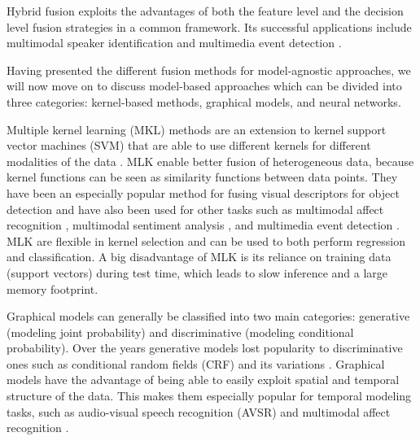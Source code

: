 \documentclass{article}
\begin{document}
Hybrid fusion exploits the advantages of both the feature level and the decision level fusion strategies in a common framework. Its successful applications include multimodal speaker identification \citep{wu2005speaker} and multimedia event detection \citep{lan2014multimedia}.

Having presented the different fusion methods for model-agnostic approaches, we will now move on to discuss model-based approaches which can be divided into three categories: kernel-based methods, graphical models, and neural networks.

Multiple kernel learning (MKL) methods are an extension to kernel support vector machines (SVM) that are able to use different kernels for different modalities of the data \citep{goenen2011kernel}. MLK enable better fusion of heterogeneous data, because kernel functions can be seen as similarity functions between data points. They have been an especially popular method for fusing visual descriptors for object detection \citep{bucak2014kernel, gehler2009kernel, krizhevsky2012imagenet} and have also been used for other tasks such as multimodal affect recognition \citep{chen2014recog, jaques2015multi, sikka2013multiple}, multimodal sentiment analysis \citep{poria2015deep}, and multimedia event detection \citep{yeh2012novel}. MLK are flexible in kernel selection and can be used to both perform regression and classification. A big disadvantage of MLK is its reliance on training data (support vectors) during test time, which leads to slow inference and a large memory footprint.

Graphical models can generally be classified into two main categories: generative (modeling joint probability) and discriminative (modeling conditional probability). Over the years generative models lost popularity to discriminative ones such as conditional random fields (CRF) \citep{lafferty2001crf} and its variations \citep{quattoni2007hcrf, song2012multi, qin2009global}. Graphical models have the advantage of being able to easily exploit spatial and temporal structure of the data. This makes them especially popular for temporal modeling tasks, such as audio-visual speech recognition (AVSR) \citep{gurban2008dynamic} and multimodal affect recognition \citep{baltrusaitis2013dimensional}.
\end{document}
